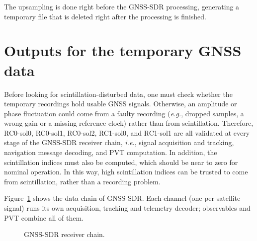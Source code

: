 \documentclass{article}
\begin{document}
The upsampling is done right before the GNSS-SDR processing, generating a temporary file that is deleted right after the processing is finished.

\section{Outputs for the temporary GNSS data}\label{sec:gnss-sdr}

Before looking for scintillation-disturbed data, one must check whether the temporary recordings hold usable GNSS signals. Otherwise, an amplitude or phase fluctuation could come from a faulty recording (\textit{e.g.}, dropped samples, a wrong gain or a missing reference clock) rather than from scintillation. Therefore, RC0-sol0, RC0-sol1, RC0-sol2, RC1-sol0, and RC1-sol1 are all validated at every stage of the GNSS-SDR receiver chain, \textit{i.e.}, signal acquisition and tracking, navigation message decoding, and PVT computation. In addition, the scintillation indices must also be computed, which should be near to zero for nominal operation. In this way, high scintillation indices can be trusted to come from scintillation, rather than a recording problem.

Figure~\ref{fig:gnss-sdr-chain} shows the data chain of GNSS-SDR. Each channel (one per satellite signal) runs its own acquisition, tracking and telemetry decoder; observables and PVT combine all of them.


\begin{figure}[H]
  \centering
  \caption{GNSS-SDR receiver chain.}
  \label{fig:gnss-sdr-chain}
\end{figure}
\end{document}
